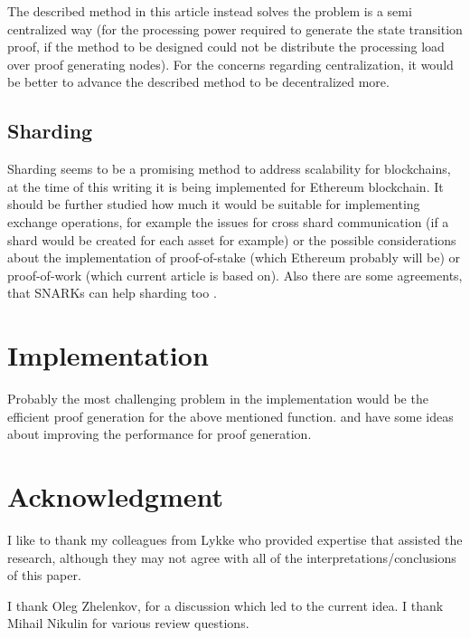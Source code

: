 \documentclass{article}
\begin{document}
The described method in this article instead solves the problem is a semi centralized way (for the processing power required to generate the state transition proof, if the method to be designed could not be distribute the processing load over proof generating nodes). For the concerns regarding centralization, it would be better to advance the described method to be decentralized more.

\subsection{Sharding}
Sharding seems to be a promising method to address scalability for blockchains, at the time of this writing it is being implemented for Ethereum blockchain. It should be further studied how much it would be suitable for implementing exchange operations, for example the issues for cross shard communication (if a shard would be created for each asset for example) or the possible considerations about the implementation of proof-of-stake (which Ethereum probably will be) or proof-of-work (which current article is based on). Also there are some agreements, that SNARKs can help sharding too \cite{sharding}.

\section{Implementation}

Probably the most challenging problem in the implementation would be the efficient proof generation for the above mentioned function. \cite{zkCluster} and \cite{scalableZKSNARK} have some ideas about improving the performance for proof generation.

\section{Acknowledgment}

I like to thank my colleagues from Lykke who provided expertise that assisted the research, although they may not agree with all of the interpretations/conclusions of this paper.

I thank Oleg Zhelenkov, for a discussion which led to the current idea. I thank Mihail Nikulin for various review questions.
\end{document}
